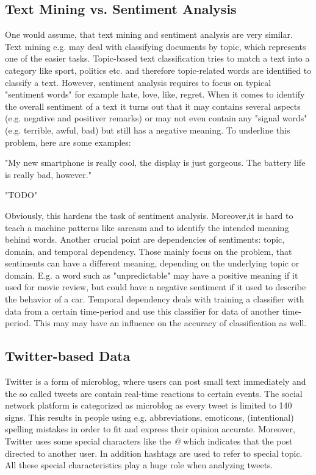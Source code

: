\documentclass{acm_proc_article-sp}
\begin{document}
\subsection{Text Mining vs. Sentiment Analysis}
One would assume, that text mining and sentiment analysis are very similar. Text mining e.g. may deal with classifying documents by topic, which represents one of the easier tasks. Topic-based text classification tries to match a text into a category like sport, politics etc. and therefore topic-related words are identified to classify a text. However, sentiment analysis requires to focus on typical "sentiment words" for example hate, love, like, regret.
When it comes to identify the overall sentiment of a text it turns out that it may contains several aspects (e.g. negative and positiver remarks) or may not even contain any "signal words" (e.g. terrible, awful, bad) but still has a negative meaning.
To underline this problem, here are some examples:

"My new smartphone is really cool, the display is just gorgeous. The battery life is really bad, however."

"TODO"

Obviously, this hardens the task of sentiment analysis. Moreover,it is hard to teach a machine patterns like sarcasm and to identify the intended meaning behind words.
\cite{liu2010sentimentanalysis,pang2008opinion}
Another crucial point are dependencies of sentiments: topic, domain, and temporal dependency. Those mainly focus on the problem, that sentiments can have a different meaning, depending on the underlying topic or domain. E.g. a word such as "unpredictable" may have a positive meaning if it used for movie review, but could have a negative sentiment if it used to describe the behavior of a car. Temporal dependency deals with training a classifier with data from a certain time-period and use this classifier for data of another time-period. This may may have an influence on the accuracy of classification as well. \cite{read2005using}

\subsection{Twitter-based Data}
Twitter is a form of microblog, where users can post small text immediately and the so called tweets are contain real-time reactions to certain events. The social network platform is categorized as microblog as every tweet is limited to 140 signs. This results in people using e.g. abbreviations, emoticons, (intentional) spelling mistakes in order to fit and express their opinion accurate. Moreover, Twitter uses some special characters like the \emph{@} which indicates that the post directed to another user. In addition hashtags are used to refer to special topic. All these special characteristics play a huge role when analyzing tweets. \cite{agarwal2011sentiment, read2005using}
\end{document}
